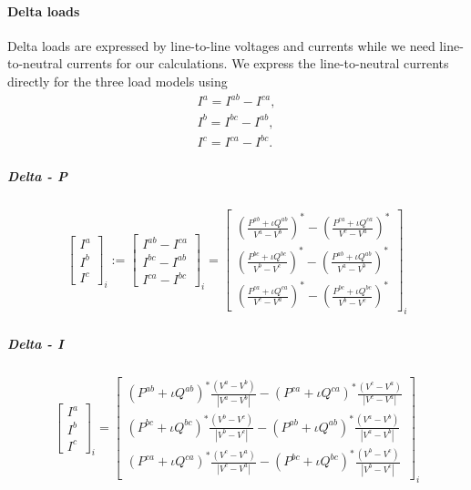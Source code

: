 \documentclass[10pt,journal]{article}
\begin{document}
\paragraph{Delta loads}
Delta loads are expressed by line-to-line voltages and currents while we need line-to-neutral currents for our calculations. We express the line-to-neutral currents directly for the three load models using \begin{align}
    I^a=I^{ab}-I^{ca},\\
    I^b=I^{bc}-I^{ab},\\
    I^c=I^{ca}-I^{bc}.
\end{align}
\subparagraph{Delta - P}
\begin{align}
\begin{bmatrix}
    I^a\\
    I^b\\
    I^c
    \end{bmatrix}_i := \begin{bmatrix}
    I^{ab}-I^{ca}\\
    I^{bc}-I^{ab}\\
    I^{ca}-I^{bc}
    \end{bmatrix}_i = \begin{bmatrix}
   (\frac{ P^{ab} +\iota Q^{ab}}{V^a-V^b})^* - (\frac{ P^{ca} +\iota Q^{ca}}{V^c-V^a})^* \\
    (\frac{ P^{bc} +\iota Q^{bc}}{V^b-V^c})^* - (\frac{ P^{ab} +\iota Q^{ab}}{V^a-V^b})^*\\
    (\frac{ P^{ca} +\iota Q^{ca}}{V^c-V^a})^* - (\frac{ P^{bc} +\iota Q^{bc}}{V^b-V^c})^*
    \end{bmatrix}_i 
    \end{align}
\subparagraph{Delta - I }
\begin{align}
\begin{bmatrix}
    I^a\\
    I^b\\
    I^c
    \end{bmatrix}_i = \begin{bmatrix}
    ({ P^{ab} +\iota Q^{ab}})^*\frac{(V^a-V^b)}{|V^a-V^b|} - ({ P^{ca} +\iota Q^{ca}})^*\frac{(V^c-V^a)}{|V^c-V^a|}  \\
    ({ P^{bc} +\iota Q^{bc}})^*\frac{(V^b-V^c)}{|V^b-V^c|} - ({ P^{ab} +\iota Q^{ab}})^*\frac{(V^a-V^b)}{|V^a-V^b|}\\
    ({ P^{ca} +\iota Q^{ca}})^*\frac{(V^c-V^a)}{|V^c-V^a|} -  ({ P^{bc} +\iota Q^{bc}})^*\frac{(V^b-V^c)}{|V^b-V^c|}
    \end{bmatrix}_i 
    \end{align}
    
\end{document}
